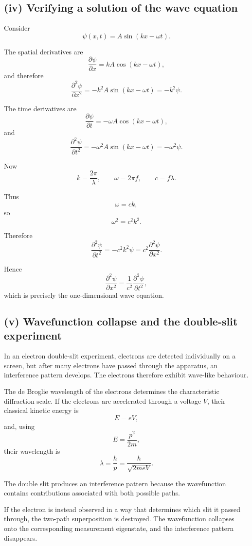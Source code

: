 \documentclass[11pt,a4paper]{article}
\begin{document}
\subsection{(iv) Verifying a solution of the wave equation}

Consider
\[
\psi(x,t)=A\sin(kx-\omega t).
\]

The spatial derivatives are
\[
\frac{\partial\psi}{\partial x}
=
kA\cos(kx-\omega t),
\]
and therefore
\[
\frac{\partial^2\psi}{\partial x^2}
=
-k^2A\sin(kx-\omega t)
=
-k^2\psi.
\]

The time derivatives are
\[
\frac{\partial\psi}{\partial t}
=
-\omega A\cos(kx-\omega t),
\]
and
\[
\frac{\partial^2\psi}{\partial t^2}
=
-\omega^2A\sin(kx-\omega t)
=
-\omega^2\psi.
\]

Now
\[
k=\frac{2\pi}{\lambda},
\qquad
\omega=2\pi f,
\qquad
c=f\lambda.
\]

Thus
\[
\omega=ck,
\]
so
\[
\omega^2=c^2k^2.
\]

Therefore
\[
\frac{\partial^2\psi}{\partial t^2}
=
-c^2k^2\psi
=
c^2\frac{\partial^2\psi}{\partial x^2}.
\]

Hence
\[
\boxed{
\frac{\partial^2\psi}{\partial x^2}
=
\frac{1}{c^2}
\frac{\partial^2\psi}{\partial t^2}
},
\]
which is precisely the one-dimensional wave equation.

\subsection{(v) Wavefunction collapse and the double-slit experiment}

In an electron double-slit experiment, electrons are detected individually on a
screen, but after many electrons have passed through the apparatus, an
interference pattern develops. The electrons therefore exhibit wave-like
behaviour.

The de Broglie wavelength of the electrons determines the characteristic
diffraction scale. If the electrons are accelerated through a voltage $V$, their
classical kinetic energy is
\[
E=eV,
\]
and, using
\[
E=\frac{p^2}{2m},
\]
their wavelength is
\[
\lambda
=
\frac{h}{p}
=
\frac{h}{\sqrt{2meV}}.
\]

The double slit produces an interference pattern because the wavefunction
contains contributions associated with both possible paths.

If the electron is instead observed in a way that determines which slit it
passed through, the two-path superposition is destroyed. The wavefunction
collapses onto the corresponding measurement eigenstate, and the interference
pattern disappears.
\end{document}
